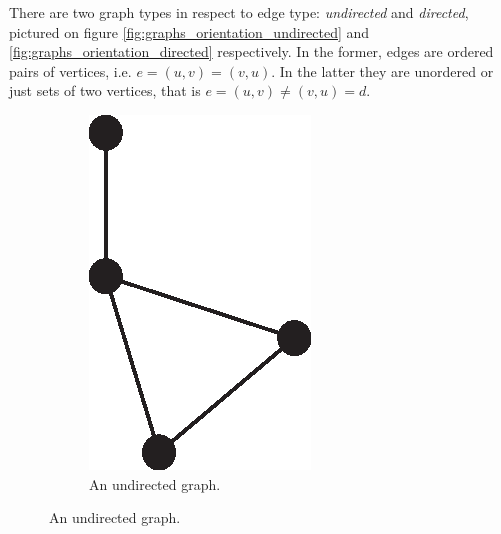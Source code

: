       There are two graph types in respect to edge type: \emph{undirected} and \emph{directed}, pictured on figure \ref{fig:graphs_orientation_undirected} and \ref{fig:graphs_orientation_directed} respectively. In the former, edges are ordered pairs of vertices, i.e. $e = (u, v) = (v, u)$. In the latter they are unordered or just sets of two vertices, that is $e = (u, v) \neq (v, u) = d$.
      \begin{figure}[H]
        \centering        
          \begin{subfigure}[b]{0.27\textwidth}
            \includegraphics[width=\textwidth]{chapters/02_problem_definition/graph_undirected}
            \caption{An undirected graph.}

\end{subfigure}
\end{figure}
